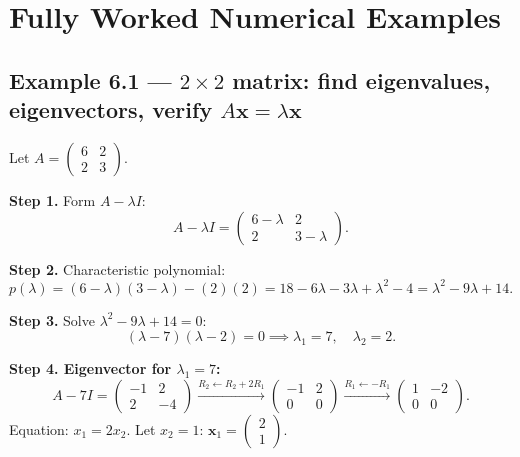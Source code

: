 \documentclass[12pt,a4paper]{article}
\begin{document}
\section{Fully Worked Numerical Examples}

\subsection*{Example 6.1 --- $2\times 2$ matrix: find eigenvalues, eigenvectors, verify $A\mathbf{x}=\lambda\mathbf{x}$}

Let $A = \begin{pmatrix} 6 & 2 \\ 2 & 3 \end{pmatrix}$.

\textbf{Step 1.} Form $A - \lambda I$:
\[
  A - \lambda I = \begin{pmatrix} 6-\lambda & 2 \\ 2 & 3-\lambda \end{pmatrix}.
\]

\textbf{Step 2.} Characteristic polynomial:
\[
  p(\lambda) = (6-\lambda)(3-\lambda) - (2)(2)
  = 18 - 6\lambda - 3\lambda + \lambda^2 - 4
  = \lambda^2 - 9\lambda + 14.
\]

\textbf{Step 3.} Solve $\lambda^2 - 9\lambda + 14 = 0$:
\[
  (\lambda - 7)(\lambda - 2) = 0 \implies \lambda_1 = 7,\quad \lambda_2 = 2.
\]

\textbf{Step 4. Eigenvector for $\lambda_1 = 7$:}
\[
  A - 7I = \begin{pmatrix} -1 & 2 \\ 2 & -4 \end{pmatrix}
  \xrightarrow{R_2 \leftarrow R_2 + 2R_1}
  \begin{pmatrix} -1 & 2 \\ 0 & 0 \end{pmatrix}
  \xrightarrow{R_1 \leftarrow -R_1}
  \begin{pmatrix} 1 & -2 \\ 0 & 0 \end{pmatrix}.
\]
Equation: $x_1 = 2x_2$. Let $x_2 = 1$: $\mathbf{x}_1 = \begin{pmatrix}2\\1\end{pmatrix}$.
\end{document}
